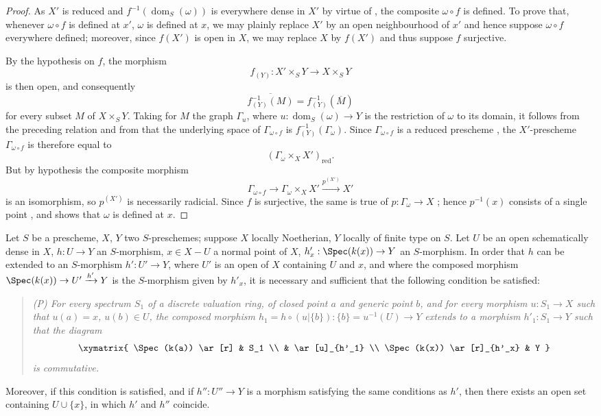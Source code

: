 \begin{proof}
As $X'$ is reduced and $f^{-1}(\operatorname{dom}_S(\omega))$ is everywhere dense in $X'$ by virtue of , the composite $\omega\circ f$ is defined.
To prove that, whenever $\omega\circ f$ is defined at $x'$, $\omega$ is defined at $x$, we may plainly replace $X'$ by an open neighbourhood of $x'$ and hence suppose $\omega\circ f$ everywhere defined;
moreover, since $f(X')$ is open in $X$, we may replace $X$ by $f(X')$ and thus suppose $f$ surjective.

By the hypothesis on $f$, the morphism
\[
  f_{(Y)}:X'\times_S Y\longrightarrow X\times_S Y
\]
is then open, and consequently
\[
  \overline{f_{(Y)}^{-1}(M)}=f_{(Y)}^{-1}(\overline{M})
\]
for every subset $M$ of $X\times_S Y$.
Taking for $M$ the graph $\Gamma_u$, where $u:\operatorname{dom}_S(\omega)\to Y$ is the restriction of $\omega$ to its domain, it follows from the preceding relation and from  that the underlying space of $\Gamma_{\omega\circ f}$ is $f_{(Y)}^{-1}(\Gamma_\omega)$.
Since $\Gamma_{\omega\circ f}$ is a reduced prescheme , the $X'$-prescheme $\Gamma_{\omega\circ f}$ is therefore equal to
\[
  (\Gamma_\omega\times_X X')_{\mathrm{red}}.
\]
But by hypothesis the composite morphism
\[
  \Gamma_{\omega\circ f}\longrightarrow\Gamma_\omega\times_X X'
  \xrightarrow{p^{(X')}}X'
\]
is an isomorphism, so $p^{(X')}$ is necessarily radicial.
Since $f$ is surjective, the same is true of $p:\Gamma_\omega\to X$ ; hence $p^{-1}(x)$ consists of a single point , and  shows that $\omega$ is defined at $x$.
\end{proof}

\begin{proposition}[20.4.6]
\label{IV.20.4.6}
Let $S$ be a prescheme, $X$, $Y$ two $S$-preschemes;
suppose $X$ locally Noetherian, $Y$ locally of finite type on $S$.
Let $U$ be an open schematically dense in $X$, $h:U\to Y$ an $S$-morphism, $x\in X-U$ a normal point of $X$, $h'_x:\Spec(k(x))\to Y$ an $S$-morphism.
In order that $h$ can be extended to an $S$-morphism $h':U'\to Y$, where $U'$ is an open of $X$ containing $U$ and $x$, and where the composed morphism $\Spec(k(x))\to U'\xrightarrow{h'}Y$ is the $S$-morphism given by $h'_x$, it is necessary and sufficient that the following condition be satisfied:
\begin{quote}
\emph{(P) For every spectrum $S_1$ of a discrete valuation ring, of closed point $a$ and generic point $b$, and for every morphism $u:S_1\to X$ such that $u(a)=x$, $u(b)\in U$, the composed morphism $h_1=h\circ(u|\{b\}):\{b\}=u^{-1}(U)\to Y$ extends to a morphism $h'_1:S_1\to Y$ such that the diagram}
\[
  \xymatrix{
  \Spec(k(a)) \ar[r] & S_1 \\
  & \ar[u]_{h'_1} \\
  \Spec(k(x)) \ar[r]_{h'_x} & Y
  }
\]
\emph{is commutative.}
\end{quote}
Moreover, if this condition is satisfied, and if $h'':U''\to Y$ is a morphism satisfying the same conditions as $h'$, then there exists an open set containing $U\cup\{x\}$, in which $h'$ and $h''$ coincide.
\end{proposition}

